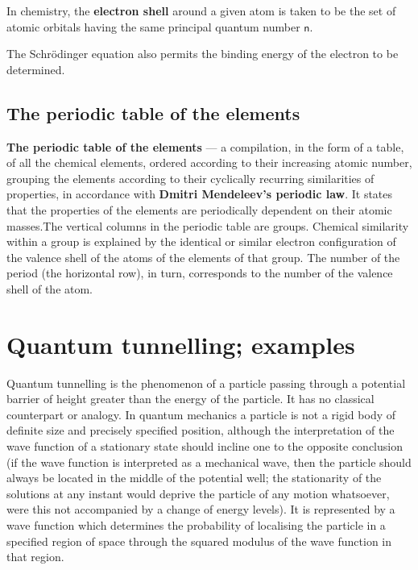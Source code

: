 In chemistry, the \textbf{electron shell} around a given atom is taken to be the set of atomic orbitals having the same principal quantum number $\mathsf{n}$.

The Schrödinger equation also permits the binding energy of the electron to be determined.

\subsection{The periodic table of the elements}

\textbf{The periodic table of the elements} --- a compilation, in the form of a table, of all the chemical elements, ordered according to their increasing atomic number, grouping the elements according to their cyclically recurring similarities of properties, in accordance with \textbf{Dmitri Mendeleev's periodic law}. It states that the properties of the elements are periodically dependent on their atomic masses.\merr The vertical columns in the periodic table are groups. Chemical similarity within a group is explained by the identical or similar electron configuration of the valence shell of the atoms of the elements of that group. The number of the period (the horizontal row), in turn, corresponds to the number of the valence shell of the atom.

\section{Quantum tunnelling; examples}

Quantum tunnelling is the phenomenon of a particle passing through a potential barrier of height greater than the energy of the particle. It has no classical counterpart or analogy. In quantum mechanics a particle is not a rigid body of definite size and precisely specified position, although the interpretation of the wave function of a stationary state should incline one to the opposite conclusion (if the wave function is interpreted as a mechanical wave, then the particle should always be located in the middle of the potential well; the stationarity of the solutions at any instant would deprive the particle of any motion whatsoever, were this not accompanied by a change of energy levels). It is represented by a wave function which determines the probability of localising the particle in a specified region of space through the squared modulus of the wave function in that region.

